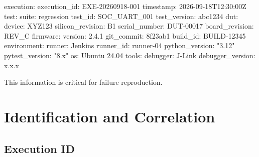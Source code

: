 \documentclass[
  11pt,
  letterpaper,
  DIV=11,
  numbers=noendperiod]{scrartcl}
\newenvironment{Shaded}{}{}
\newcommand{\AttributeTok}[1]{\textcolor[rgb]{0.84,0.23,0.29}{#1}}
\newcommand{\FloatTok}[1]{\textcolor[rgb]{0.00,0.36,0.77}{#1}}
\newcommand{\FunctionTok}[1]{\textcolor[rgb]{0.44,0.26,0.76}{#1}}
\newcommand{\KeywordTok}[1]{\textcolor[rgb]{0.84,0.23,0.29}{#1}}
\newcommand{\StringTok}[1]{\textcolor[rgb]{0.01,0.18,0.38}{#1}}
\begin{document}
\begin{Shaded}
\begin{Highlighting}[]
\FunctionTok{execution}\KeywordTok{:}
\AttributeTok{  }\FunctionTok{execution\_id}\KeywordTok{:}\AttributeTok{ EXE{-}20260918{-}001}
\AttributeTok{  }\FunctionTok{timestamp}\KeywordTok{:}\AttributeTok{ 2026{-}09{-}18T12:30:00Z}
\FunctionTok{test}\KeywordTok{:}
\AttributeTok{  }\FunctionTok{suite}\KeywordTok{:}\AttributeTok{ regression}
\AttributeTok{  }\FunctionTok{test\_id}\KeywordTok{:}\AttributeTok{ SOC\_UART\_001}
\AttributeTok{  }\FunctionTok{test\_version}\KeywordTok{:}\AttributeTok{ abc1234}
\FunctionTok{dut}\KeywordTok{:}
\AttributeTok{  }\FunctionTok{device}\KeywordTok{:}\AttributeTok{ XYZ123}
\AttributeTok{  }\FunctionTok{silicon\_revision}\KeywordTok{:}\AttributeTok{ B1}
\AttributeTok{  }\FunctionTok{serial\_number}\KeywordTok{:}\AttributeTok{ DUT{-}00017}
\AttributeTok{  }\FunctionTok{board\_revision}\KeywordTok{:}\AttributeTok{ REV\_C}
\FunctionTok{firmware}\KeywordTok{:}
\AttributeTok{  }\FunctionTok{version}\KeywordTok{:}\AttributeTok{ }\FloatTok{2.4.1}
\AttributeTok{  }\FunctionTok{git\_commit}\KeywordTok{:}\AttributeTok{ 8f23ab1}
\AttributeTok{  }\FunctionTok{build\_id}\KeywordTok{:}\AttributeTok{ BUILD{-}12345}
\FunctionTok{environment}\KeywordTok{:}
\AttributeTok{  }\FunctionTok{runner}\KeywordTok{:}\AttributeTok{ Jenkins}
\AttributeTok{  }\FunctionTok{runner\_id}\KeywordTok{:}\AttributeTok{ runner{-}04}
\AttributeTok{  }\FunctionTok{python\_version}\KeywordTok{:}\AttributeTok{ }\StringTok{"3.12"}
\AttributeTok{  }\FunctionTok{pytest\_version}\KeywordTok{:}\AttributeTok{ }\StringTok{"8.x"}
\AttributeTok{  }\FunctionTok{os}\KeywordTok{:}\AttributeTok{ Ubuntu 24.04}
\FunctionTok{tools}\KeywordTok{:}
\AttributeTok{  }\FunctionTok{debugger}\KeywordTok{:}\AttributeTok{ J{-}Link}
\AttributeTok{  }\FunctionTok{debugger\_version}\KeywordTok{:}\AttributeTok{ x.x.x}
\end{Highlighting}
\end{Shaded}

This information is critical for failure reproduction.

\section{Identification and
Correlation}\label{identification-and-correlation}

\subsection{Execution ID}\label{execution-id}
\end{document}
